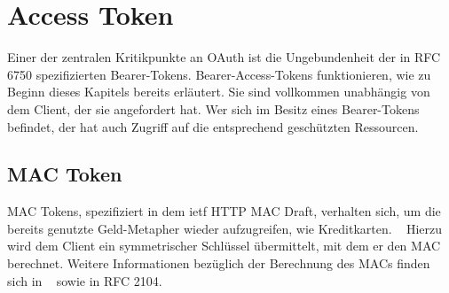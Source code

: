 \section{Access Token}\label{accessTokens}
Einer der zentralen Kritikpunkte an \gls{OAuth} ist die Ungebundenheit der in
RFC 6750 spezifizierten Bearer-Tokens. Bearer-Access-Tokens funktionieren, wie
zu Beginn dieses Kapitels bereits erläutert. Sie sind vollkommen unabhängig von
dem Client, der sie angefordert hat. Wer sich im Besitz eines Bearer-Tokens
befindet, der hat auch Zugriff auf die entsprechend geschützten Ressourcen.

\subsection{MAC Token}\label{ssec: MAC Token}
MAC Tokens, spezifiziert in dem \gls{ietf} HTTP MAC Draft, verhalten sich, um
die bereits genutzte Geld-Metapher wieder aufzugreifen, wie Kreditkarten.
~ Hierzu wird dem Client ein symmetrischer
Schlüssel übermittelt, mit dem er den MAC berechnet. 
Weitere Informationen bezüglich der Berechnung des MACs finden sich in
~\cite[S.~136ff.]{Siriwardena.2014} sowie in RFC 2104.
